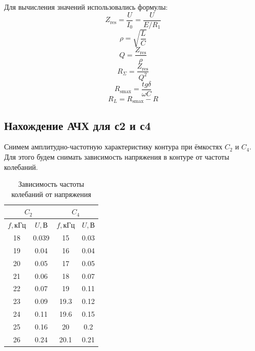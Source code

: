 \documentclass[a4paper]{article}
\begin{document}
Для вычисления значений использовались формулы:\\
$$Z_\text{res} = \frac{U}{I_0} = \frac{U}{E/R_1}$$
$$\rho = \sqrt{\frac{L}{C}}$$
$$Q = \frac{Z_\text{res}}{\rho}$$
$$R_{\Sigma} = \frac{Z_\text{res}}{Q^2}$$
$$R_\text{smax} = \frac{tg\delta}{\omega C}$$
$$R_L = R_\text{smax} - R$$

\subsection{Нахождение АЧХ для с2 и с4}
Снимем амплитудно-частотную характеристику контура при ёмкостях $C_2$ и $C_4$. Для этого будем снимать зависимость напряжения в контуре от частоты колебаний.

\begin{table}[H]
    \centering
    \begin{center}
        \caption{Зависимость частоты колебаний от напряжения}
    \end{center}
    \vspace{0.1cm}
    \label{tab:my_label}
    \begin{tabular}{|c|c|c|c|}
        \hline
        \multicolumn{2}{|c|}{$C_2$} & \multicolumn{2}{c|}{$C_4$}                     \\
        \hline
        $f, $кГц                    & $U, $В                     & $f, $кГц & $U, $В \\
        \hline
        18                          & 0.039                      & 15       & 0.03   \\ \hline
        19                          & 0.04                       & 16       & 0.04   \\ \hline
        20                          & 0.05                       & 17       & 0.05   \\ \hline
        21                          & 0.06                       & 18       & 0.07   \\ \hline
        22                          & 0.07                       & 19       & 0.11   \\ \hline
        23                          & 0.09                       & 19.3     & 0.12   \\ \hline
        24                          & 0.11                       & 19.6     & 0.15   \\ \hline
        25                          & 0.16                       & 20       & 0.2    \\ \hline
        26                          & 0.24                       & 20.1     & 0.21   \\ \hline

\end{tabular}
\end{table}
\end{document}
